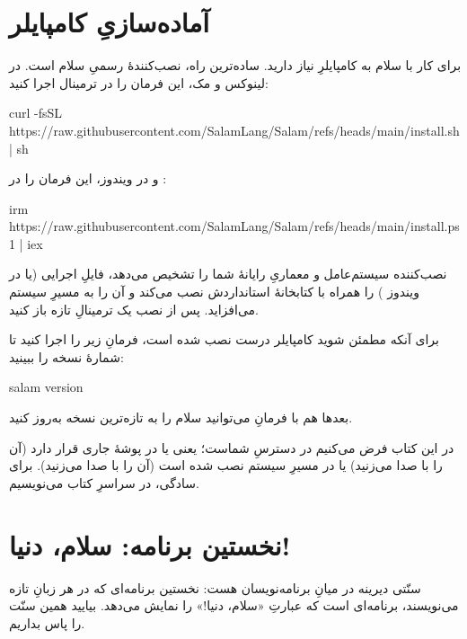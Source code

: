 \section{آماده‌سازیِ کامپایلر}

برای کار با سلام به کامپایلرِ  نیاز دارید. ساده‌ترین راه، نصب‌کنندهٔ
رسمیِ سلام است. در لینوکس و مک، این فرمان را در ترمینال اجرا کنید:

\begin{salamen}[language={}]
curl -fsSL https://raw.githubusercontent.com/SalamLang/Salam/refs/heads/main/install.sh | sh
\end{salamen}

و در ویندوز، این فرمان را در :

\begin{salamen}[language={}]
irm https://raw.githubusercontent.com/SalamLang/Salam/refs/heads/main/install.ps1 | iex
\end{salamen}

نصب‌کننده سیستم‌عامل و معماریِ رایانهٔ شما را تشخیص می‌دهد، فایلِ اجرایی
 (یا در ویندوز ) را همراه با کتابخانهٔ استانداردش
نصب می‌کند و آن را به مسیرِ سیستم می‌افزاید. پس از نصب یک ترمینالِ تازه باز کنید.

\begin{tip}
برای آنکه مطمئن شوید کامپایلر درست نصب شده است، فرمانِ زیر را اجرا کنید تا
شمارهٔ نسخه را ببینید:
\begin{salamen}[language={}]
salam version
\end{salamen}
بعدها هم با فرمانِ  می‌توانید سلام را به تازه‌ترین نسخه
به‌روز کنید.
\end{tip}

\begin{note}
در این کتاب فرض می‌کنیم  در دسترسِ شماست؛ یعنی یا در پوشهٔ جاری
قرار دارد (آن را با  صدا می‌زنید) یا در مسیرِ سیستم نصب شده است
(آن را با  صدا می‌زنید). برای سادگی، در سراسرِ کتاب 
می‌نویسیم.
\end{note}

\section{نخستین برنامه: سلام، دنیا!}

سنّتی دیرینه در میانِ برنامه‌نویسان هست: نخستین برنامه‌ای که در هر زبانِ تازه
می‌نویسند، برنامه‌ای است که عبارتِ «سلام، دنیا!» را نمایش می‌دهد. بیایید همین
سنّت را پاس بداریم.

